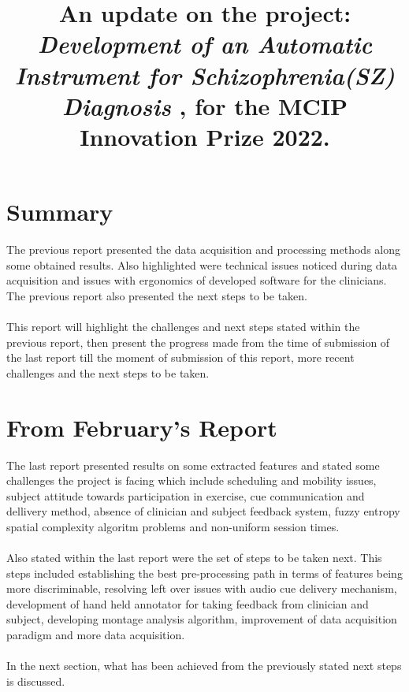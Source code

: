 \documentclass[10pt]{article}
\title{
  An update on the project: 
  \textbf{
      \textit{
        Development of an Automatic Instrument for Schizophrenia(SZ) Diagnosis
        }
      }, for the MCIP Innovation Prize 2022.
  }
\begin{document}
\maketitle

\section{Summary}
The previous report presented the data acquisition and processing methods along some obtained 
results. Also highlighted were technical issues noticed during data acquisition and 
issues with ergonomics of developed software for the clinicians. The previous report also 
presented the next steps to be taken.\\
\\
This report will highlight the challenges and next steps stated within the previous report, 
then present the progress made from the time of submission of the last report till the moment of 
submission of this report, more recent challenges and the next steps to be taken.

\section{From February's Report}
The last report presented results on some extracted features and stated some challenges the project is 
facing which include scheduling and mobility issues, 
subject attitude towards participation in exercise, cue communication and dellivery method, absence of 
clinician and subject feedback system, fuzzy entropy spatial complexity algoritm problems and non-uniform session times.\\
\\
Also stated within the last report were the set of steps to be taken next. This steps included establishing 
the best pre-processing path in terms of features being more discriminable, resolving left over issues 
with audio cue delivery mechanism, development of hand held annotator for taking feedback from clinician and 
subject, developing montage analysis algorithm, improvement of data acquisition paradigm and more data acquisition.\\
\\
In the next section, what has been achieved from the previously stated next steps is discussed.
\end{document}
